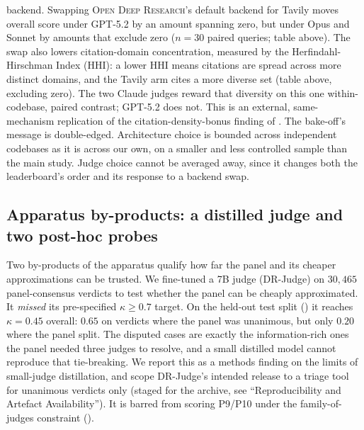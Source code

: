 \documentclass[11pt]{article}
\begin{document}
backend. Swapping \textsc{Open Deep Research}'s default backend for Tavily moves overall
score under GPT-5.2 by an amount spanning zero, but under Opus and Sonnet by amounts that
exclude zero ($n{=}30$ paired queries; table above). The swap also lowers
citation-domain concentration, measured by the Herfindahl-Hirschman Index (HHI): a lower
HHI means citations are spread across more distinct domains, and the Tavily arm cites a
more diverse set (table above, excluding zero). The
two Claude judges reward that diversity on this one within-codebase, paired contrast;
GPT-5.2 does not. This is an external, same-mechanism
replication of the citation-density-bonus finding of . The
bake-off's message is double-edged. Architecture choice is bounded
across independent codebases as it is across our own, on a smaller and less controlled
sample than the main study. Judge choice cannot be averaged away, since it
changes both the leaderboard's order and its response to a backend swap.

\subsection{Apparatus by-products: a distilled judge and two post-hoc probes}\label{sec:drjudge}
Two by-products of the apparatus qualify how far the panel and its cheaper
approximations can be trusted. We fine-tuned
a 7B judge (DR-Judge) on $30{,}465$ panel-consensus verdicts to test whether the panel
can be cheaply approximated. It \emph{missed} its pre-specified $\kappa\geq0.7$ target.
On the held-out test split () it reaches $\kappa=0.45$ overall: $0.65$
on verdicts where the panel was unanimous, but only $0.20$ where the panel split. The
disputed cases are exactly the information-rich ones the panel needed three judges to
resolve, and a small distilled model cannot reproduce that tie-breaking. We report this
as a methods finding on the limits of small-judge distillation, and scope DR-Judge's
intended release to a triage tool for unanimous verdicts only (staged for the archive,
see ``Reproducibility and Artefact Availability''). It is barred from scoring P9/P10
under the family-of-judges constraint ().
\end{document}
